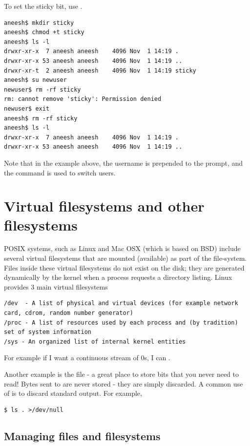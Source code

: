 To set the sticky bit, use .

\begin{lstlisting}
aneesh$ mkdir sticky
aneesh$ chmod +t sticky 
aneesh$ ls -l
drwxr-xr-x  7 aneesh aneesh    4096 Nov  1 14:19 .
drwxr-xr-x 53 aneesh aneesh    4096 Nov  1 14:19 ..
drwxr-xr-t  2 aneesh aneesh    4096 Nov  1 14:19 sticky
aneesh$ su newuser
newuser$ rm -rf sticky
rm: cannot remove 'sticky': Permission denied
newuser$ exit
aneesh$ rm -rf sticky
aneesh$ ls -l
drwxr-xr-x  7 aneesh aneesh    4096 Nov  1 14:19 .
drwxr-xr-x 53 aneesh aneesh    4096 Nov  1 14:19 ..
\end{lstlisting}

Note that in the example above, the username is prepended to the prompt, and the command  is used to switch users.

\section{Virtual filesystems and other filesystems}

POSIX systems, such as Linux and Mac OSX (which is based on BSD) include several virtual filesystems that are mounted (available) as part of the file-system. Files inside these virtual filesystems do not exist on the disk; they are generated dynamically by the kernel when a process requests a directory listing. Linux provides 3 main virtual filesystems

\begin{lstlisting}
/dev  - A list of physical and virtual devices (for example network card, cdrom, random number generator)
/proc - A list of resources used by each process and (by tradition) set of system information
/sys - An organized list of internal kernel entities
\end{lstlisting}

For example if I want a continuous stream of 0s, I can .

Another example is the file  - a great place to store bits that you never need to read! Bytes sent to  are never stored - they are simply discarded. A common use of  is to discard standard output. For example,

\begin{lstlisting}
$ ls . >/dev/null
\end{lstlisting}

\subsection{Managing files and filesystems}


